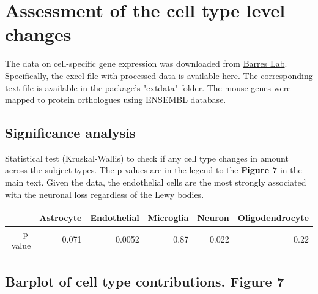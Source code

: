 \documentclass[11pt]{article}\usepackage[]{graphicx}\usepackage[usenames,dvipsnames]{color}
\begin{document}
\section{Assessment of the cell type level changes}

The data on cell-specific gene expression was downloaded from 
\href{http://web.stanford.edu/group/barres_lab/brain_rnaseq.html}{Barres Lab}.
Specifically, the excel file with processed data is available
\href{http://web.stanford.edu/group/barres_lab/barreslab_rnaseq.xlsx}{here}.
The corresponding text file is available in the package's "extdata" folder.
The mouse genes were mapped to protein orthologues using ENSEMBL database.









\subsection{Significance analysis}

Statistical test (Kruskal-Wallis) to check if any cell type changes in 
amount across the subject types. 
The p-values are in the legend to the 
\textcolor{black}{\colorbox{highlighter}{\textbf{Figure 7}}} in the main text. 
Given the data, the endothelial cells are the most strongly associated 
with the neuronal loss regardless of the Lewy bodies.

\begin{table}[ht]
\centering
\begin{tabular}{rrrrrr}
  \hline
 & Astrocyte & Endothelial & Microglia & Neuron & Oligodendrocyte \\ 
  \hline
p-value & 0.071 & 0.0052 & 0.87 & 0.022 & 0.22 \\ 
   \hline
\end{tabular}
\end{table}


\subsection{Barplot of cell type contributions. Figure 7}
\end{document}
